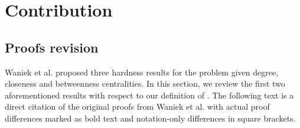 \chapter{Contribution}



\section{Proofs revision}\label{sec:proofRevs}

Waniek et al. \cite{Waniek2017} proposed three hardness results for the \HL problem given degree, closeness and betweenness
centralities. In this section, we review the first two aforementioned results with respect to our definition of \HLshort.
The following text is a direct citation of the original proofs from Waniek et al.
with actual proof differences marked as bold text and notation-only differences in square brackets.

